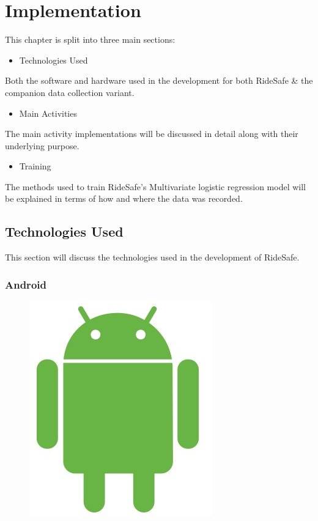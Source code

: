 \chapter{Implementation}
This chapter is split into three main sections:


\begin{itemize}
\item Technologies Used
\end{itemize}

Both the software and hardware used in the development for both RideSafe \& the companion data collection variant.



\begin{itemize}
\item Main Activities
\end{itemize}



The main activity implementations will be discussed in detail along with their underlying purpose. 

\begin{itemize}
\item Training
\end{itemize}


The methods used to train RideSafe’s Multivariate logistic regression model will be explained in terms of how and where the data was recorded.


\section{Technologies Used}
This section will discuss the technologies used in the development of RideSafe.

\subsection{Android}

\begin{figure}
\begin{center}
\includegraphics[scale = 0.3] {implementation/android.jpg}
\end{center}

\label{android}
\end{figure}

